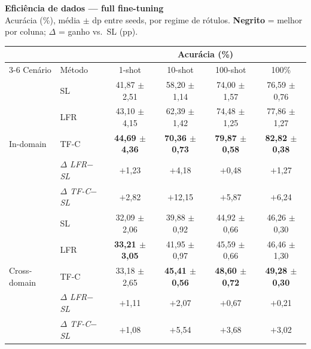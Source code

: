 \documentclass[border=8pt,varwidth=\maxdimen]{standalone}
\begin{document}
\centering
{\large\bfseries Eficiência de dados — full fine-tuning}\\[2pt]
{\scriptsize Acurácia (\%), média $\pm$ dp entre seeds, por regime de rótulos. \textbf{Negrito} = melhor por coluna; $\Delta$ = ganho vs.\ SL (pp).}\\[6pt]
\begin{tabular}{llcccc}
\toprule
& & \multicolumn{4}{c}{Acurácia (\%)}\\
\cmidrule(lr){3-6}
Cenário & Método & 1-shot & 10-shot & 100-shot & 100\%\\
\midrule
\multirow{5}{*}{In-domain}
 & SL        & 41{,}87 $\pm$ 2{,}51 & 58{,}20 $\pm$ 1{,}14 & 74{,}00 $\pm$ 1{,}57 & 76{,}59 $\pm$ 0{,}76\\
 & LFR       & 43{,}10 $\pm$ 4{,}15 & 62{,}39 $\pm$ 1{,}42 & 74{,}48 $\pm$ 1{,}25 & 77{,}86 $\pm$ 1{,}27\\
 & TF-C      & \textbf{44{,}69 $\pm$ 4{,}36} & \textbf{70{,}36 $\pm$ 0{,}73} & \textbf{79{,}87 $\pm$ 0{,}58} & \textbf{82{,}82 $\pm$ 0{,}38}\\
\cmidrule(lr){2-6}
 & \textit{$\Delta$ LFR$-$SL} & $+$1{,}23 & $+$4{,}18 & $+$0{,}48 & $+$1{,}27\\
 & \textit{$\Delta$ TF-C$-$SL} & $+$2{,}82 & $+$12{,}15 & $+$5{,}87 & $+$6{,}24\\
\midrule
\multirow{5}{*}{Cross-domain}
 & SL        & 32{,}09 $\pm$ 2{,}06 & 39{,}88 $\pm$ 0{,}92 & 44{,}92 $\pm$ 0{,}66 & 46{,}26 $\pm$ 0{,}30\\
 & LFR       & \textbf{33{,}21 $\pm$ 3{,}05} & 41{,}95 $\pm$ 0{,}97 & 45{,}59 $\pm$ 0{,}66 & 46{,}46 $\pm$ 1{,}30\\
 & TF-C      & 33{,}18 $\pm$ 2{,}65 & \textbf{45{,}41 $\pm$ 0{,}56} & \textbf{48{,}60 $\pm$ 0{,}72} & \textbf{49{,}28 $\pm$ 0{,}30}\\
\cmidrule(lr){2-6}
 & \textit{$\Delta$ LFR$-$SL} & $+$1{,}11 & $+$2{,}07 & $+$0{,}67 & $+$0{,}21\\
 & \textit{$\Delta$ TF-C$-$SL} & $+$1{,}08 & $+$5{,}54 & $+$3{,}68 & $+$3{,}02\\
\bottomrule
\end{tabular}
\end{document}
